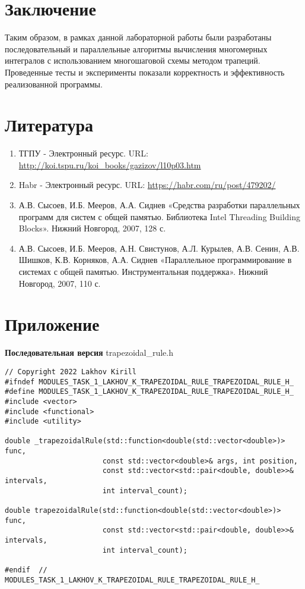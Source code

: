 \documentclass{report}
\begin{document}
\section*{Заключение}
Таким образом, в рамках данной лабораторной работы были разработаны последовательный и параллельные алгоритмы вычисления многомерных интегралов с использованием многошаговой схемы методом трапеций. Проведенные тесты и эксперименты показали корректность и эффективность реализованной программы.
\newpage

\section*{Литература}
\begin{enumerate}
\item ТГПУ - Электронный ресурс. URL: \newline \url{http://koi.tspu.ru/koi_books/gazizov/l10p03.htm}
\item Habr - Электронный ресурс. URL: \newline \url{https://habr.com/ru/post/479202/}
\item А.В. Сысоев, И.Б. Мееров, А.А. Сиднев «Средства разработки параллельных программ для систем с общей памятью. Библиотека Intel Threading Building Blocks». Нижний Новгород, 2007, 128 с. 
\item А.В. Сысоев, И.Б. Мееров, А.Н. Свистунов, А.Л. Курылев, А.В. Сенин, А.В. Шишков, К.В. Корняков, А.А. Сиднев «Параллельное программирование в системах с общей
памятью. Инструментальная поддержка». Нижний Новгород, 2007, 110 с. 
\end{enumerate} 

\newpage

\section*{Приложение}
\textbf{Последовательная версия}
\newline
\newline trapezoidal\_rule.h
\begin{lstlisting}
// Copyright 2022 Lakhov Kirill
#ifndef MODULES_TASK_1_LAKHOV_K_TRAPEZOIDAL_RULE_TRAPEZOIDAL_RULE_H_
#define MODULES_TASK_1_LAKHOV_K_TRAPEZOIDAL_RULE_TRAPEZOIDAL_RULE_H_
#include <vector>
#include <functional>
#include <utility>

double _trapezoidalRule(std::function<double(std::vector<double>)> func,
                       const std::vector<double>& args, int position,
                       const std::vector<std::pair<double, double>>& intervals,
                       int interval_count);

double trapezoidalRule(std::function<double(std::vector<double>)> func,
                       const std::vector<std::pair<double, double>>& intervals,
                       int interval_count);

#endif  // MODULES_TASK_1_LAKHOV_K_TRAPEZOIDAL_RULE_TRAPEZOIDAL_RULE_H_

\end{lstlisting}
\end{document}
